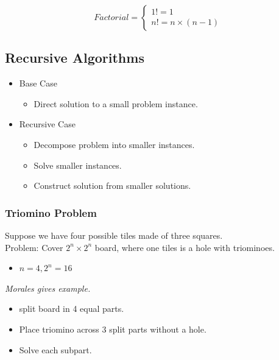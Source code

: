 \documentclass[12pt]{article}
\begin{document}
\begin{equation}
  Factorial = \left\{
    \begin{array}{rl}
      1! = 1 \\
      n! = n \times (n - 1)
    \end{array} \right.
\end{equation}

\subsection{Recursive Algorithms}
\begin{itemize}
\item Base Case

\begin{itemize}
\item Direct solution to a small problem instance.
\end{itemize}

\item Recursive Case

\begin{itemize}
\item Decompose problem into smaller instances.
\item Solve smaller instances.
\item Construct solution from smaller solutions.
\end{itemize}

\end{itemize}

\subsubsection{Triomino Problem}
Suppose we have four possible tiles made of three squares. \\

\noindent
Problem: Cover $2^n \times 2^n$ board, where one tiles is a hole with triominoes.

\begin{itemize}
\item $n = 4, 2^n = 16$
\end{itemize}

\textit{Morales gives example.}

\begin{itemize}
\item split board in 4 equal parts.
\item Place triomino across 3 split parts without a hole.
\item Solve each subpart.
\end{itemize}
\end{document}
